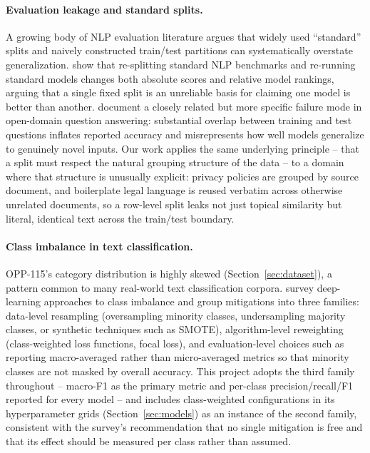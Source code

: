 \documentclass[11pt]{acl}
\begin{document}
\paragraph{Evaluation leakage and standard splits.} A growing body of NLP evaluation
literature argues that widely used ``standard'' splits and naively constructed
train/test partitions can systematically overstate generalization.
\citet{gorman-bedrick-2019-need} show that re-splitting standard NLP benchmarks and
re-running standard models changes both absolute scores and relative model rankings,
arguing that a single fixed split is an unreliable basis for claiming one model is
better than another. \citet{lewis-etal-2021-question} document a closely related but
more specific failure mode in open-domain question answering: substantial overlap
between training and test questions inflates reported accuracy and misrepresents how
well models generalize to genuinely novel inputs. Our work applies the same underlying
principle -- that a split must respect the natural grouping structure of the data --
to a domain where that structure is unusually explicit: privacy policies are grouped by
source document, and boilerplate legal language is reused verbatim across otherwise
unrelated documents, so a row-level split leaks not just topical similarity but literal,
identical text across the train/test boundary.

\paragraph{Class imbalance in text classification.} OPP-115's category distribution is
highly skewed (Section~\ref{sec:dataset}), a pattern common to many real-world text
classification corpora. \citet{johnson-khoshgoftaar-2019-survey} survey deep-learning
approaches to class imbalance and group mitigations into three families: data-level
resampling (oversampling minority classes, undersampling majority classes, or
synthetic techniques such as SMOTE), algorithm-level reweighting (class-weighted loss
functions, focal loss), and evaluation-level choices such as reporting macro-averaged
rather than micro-averaged metrics so that minority classes are not masked by overall
accuracy. This project adopts the third family throughout -- macro-F1 as the primary
metric and per-class precision/recall/F1 reported for every model -- and includes
class-weighted configurations in its hyperparameter grids (Section~\ref{sec:models}) as
an instance of the second family, consistent with the survey's recommendation that no
single mitigation is free and that its effect should be measured per class rather than
assumed.
\end{document}
